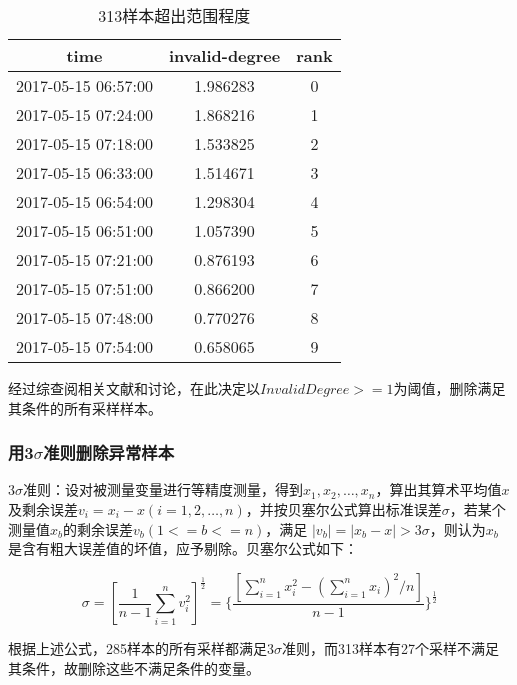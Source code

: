 \documentclass[bwprint]{gmcmthesis}
\begin{document}
\begin{table}[htb]
	\caption{313样本超出范围程度}\label{tab:001} \centering
	\begin{tabular}{ccc}
	\toprule[1.5pt]
	time &  invalid-degree &  rank \\
	\midrule[1pt]
	2017-05-15 06:57:00 &        1.986283 &     0 \\
	2017-05-15 07:24:00 &        1.868216 &     1 \\
	2017-05-15 07:18:00 &        1.533825 &     2 \\
	2017-05-15 06:33:00 &        1.514671 &     3 \\
	2017-05-15 06:54:00 &        1.298304 &     4 \\
	2017-05-15 06:51:00 &        1.057390 &     5 \\
	2017-05-15 07:21:00 &        0.876193 &     6 \\
	2017-05-15 07:51:00 &        0.866200 &     7 \\
	2017-05-15 07:48:00 &        0.770276 &     8 \\
	2017-05-15 07:54:00 &        0.658065 &     9 \\
	\bottomrule[1.5pt]
\end{tabular}
\end{table}


经过综查阅相关文献和讨论，在此决定以$InvalidDegree >= 1$为阈值，删除满足其条件的所有采样样本。



\FloatBarrier
\subsubsection{用3$\sigma$准则删除异常样本}

3$\sigma$准则：设对被测量变量进行等精度测量，得到$x_1, x_2, \ldots, x_n$，算出其算术平均值$x$及剩余误差$v_i=x_i-x (i=1, 2, \ldots , n)$，并按贝塞尔公式算出标准误差$\sigma$，若某个测量值$x_b$的剩余误差$v_b ( 1 <= b <= n )$，满足 $|v_b| = | x_b - x | > 3\sigma$，则认为$x_b$是含有粗大误差值的坏值，应予剔除。贝塞尔公式如下：

\begin{equation}\label{eq:3sigma}
	\sigma = [\frac{1}{n-1}\sum_{i=1}^{n}v_i^2]^{\frac{1}{2}} = \{\frac{[\sum^n_{i=1}x_i^2 - (\sum^n_{i=1}x_i)^2/n]}{n-1}\}^{\frac{1}{2}}
\end{equation}

根据上述公式，285样本的所有采样都满足3$\sigma$准则，而313样本有27个采样不满足其条件，故删除这些不满足条件的变量。
\end{document}
